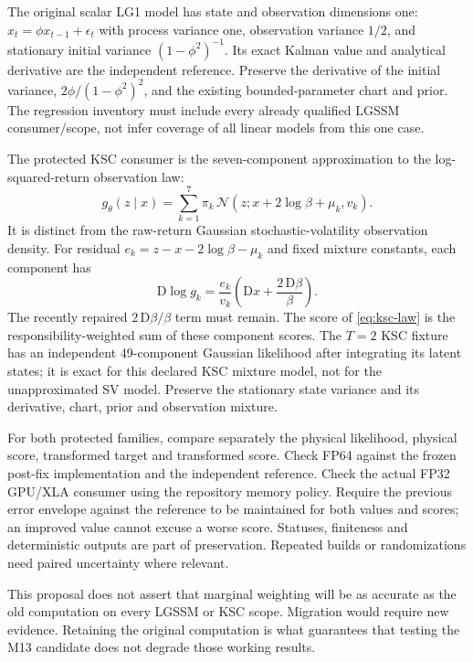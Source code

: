 \documentclass[11pt]{article}
\newcommand{\D}{\mathrm D}
\newcommand{\N}{\mathcal N}
\begin{document}
The original scalar LG1 model has state and observation dimensions one:
$x_t=\phi x_{t-1}+\epsilon_t$ with process variance one, observation
variance $1/2$, and stationary initial variance $(1-\phi^2)^{-1}$.
Its exact Kalman value and analytical derivative are the independent
reference. Preserve the derivative of the initial variance,
$2\phi/(1-\phi^2)^2$, and the existing bounded-parameter chart and prior.
The regression inventory must include every already qualified LGSSM
consumer/scope, not infer coverage of all linear models from this one case.

The protected KSC consumer is the seven-component approximation to the
log-squared-return observation law:
\begin{equation}
 g_\theta(z\mid x)=
       \sum_{k=1}^7\pi_k\,\N(z;x+2\log\beta+\mu_k,v_k).
 \label{eq:ksc-law}
\end{equation}
It is distinct from the raw-return Gaussian stochastic-volatility
observation density. For residual
$e_k=z-x-2\log\beta-\mu_k$ and fixed mixture constants, each component has
\begin{equation}
 \D\log g_k=\frac{e_k}{v_k}
                  \left(\D x+\frac{2\,\D\beta}{\beta}\right).
 \label{eq:ksc-tangent}
\end{equation}
The recently repaired $2\,\D\beta/\beta$ term must remain.
The score of \eqref{eq:ksc-law} is the responsibility-weighted sum of these
component scores. The $T=2$ KSC fixture has an independent 49-component
Gaussian likelihood after integrating its latent states; it is exact for
this declared KSC mixture model, not for the unapproximated SV model.
Preserve the stationary state variance and its derivative, chart,
prior and observation mixture.

For both protected families, compare separately the physical likelihood,
physical score, transformed target and transformed score. Check FP64
against the frozen post-fix implementation and the independent reference.
Check the actual FP32 GPU/XLA consumer using the repository memory policy.
Require the previous error envelope against the reference to be maintained
for both values and scores; an improved value cannot excuse a worse score.
Statuses, finiteness and deterministic outputs are part of preservation.
Repeated builds or randomizations need paired uncertainty where relevant.

This proposal does not assert that marginal weighting will be as accurate
as the old computation on every LGSSM or KSC scope. Migration would require
new evidence. Retaining the original computation is what guarantees that
testing the M13 candidate does not degrade those working results.
\end{document}
